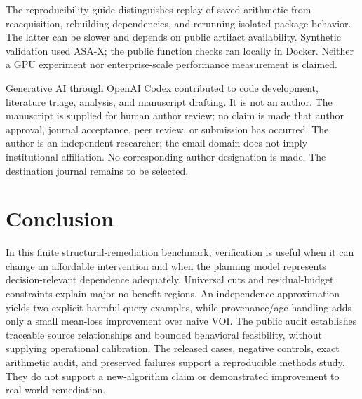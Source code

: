 \documentclass[manuscript,screen,nonacm]{acmart}
\begin{document}
The reproducibility guide distinguishes replay of saved arithmetic from reacquisition, rebuilding dependencies, and rerunning isolated package behavior. The latter can be slower and depends on public artifact availability. Synthetic validation used ASA-X; the public function checks ran locally in Docker. Neither a GPU experiment nor enterprise-scale performance measurement is claimed.

Generative AI through OpenAI Codex contributed to code development, literature triage, analysis, and manuscript drafting. It is not an author. The manuscript is supplied for human author review; no claim is made that author approval, journal acceptance, peer review, or submission has occurred. The author is an independent researcher; the email domain does not imply institutional affiliation. No corresponding-author designation is made. The destination journal remains to be selected.

\section{Conclusion}
In this finite structural-remediation benchmark, verification is useful when it can change an affordable intervention and when the planning model represents decision-relevant dependence adequately. Universal cuts and residual-budget constraints explain major no-benefit regions. An independence approximation yields two explicit harmful-query examples, while provenance/age handling adds only a small mean-loss improvement over naive VOI. The public audit establishes traceable source relationships and bounded behavioral feasibility, without supplying operational calibration. The released cases, negative controls, exact arithmetic audit, and preserved failures support a reproducible methods study. They do not support a new-algorithm claim or demonstrated improvement to real-world remediation.
\end{document}
